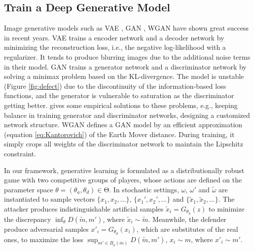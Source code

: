 \documentclass{article}
\begin{document}


\subsection{Train a Deep Generative Model}
Image generative models such as VAE \cite{DBLP:journals/corr/KingmaW13}, GAN \cite{NIPS2014_5423}, WGAN \cite{DBLP:journals/corr/ArjovskyCB17} have shown great success in recent years. VAE trains a encoder network and a decoder network by minimizing the reconstruction loss, i.e., the negative log-likelihood with a regularizer. It tends to produce blurring images due to the additional noise terms in their model. GAN trains a generator network and a discriminator network by solving a minimax problem based on the KL-divergence. The model is unstable (Figure \ref{fig:defect}) due to the discontinuity of the information-based loss functions, and the generator is vulnerable to saturation as the discriminator getting better. \cite{DBLP:journals/corr/ArjovskyB17, DBLP:conf/nips/SalimansGZCRCC16} gives some empirical solutions to these problems, e.g., keeping balance in training generator and discriminator networks, designing a customized network structure. WGAN \cite{DBLP:journals/corr/ArjovskyCB17} defines a GAN model by an efficient approximation (equation \ref{eq:Kantorovich}) of the Earth Mover distance. During training, it simply crops all weights of the discriminator network to maintain the Lipschitz constraint.

In our framework, generative learning is formulated as a distributionally robust game with two competitive groups of players, whose actions are defined on the parameter space $\theta = (\theta_a, \theta_d) \in \mathrm{\Theta}$. In stochastic settings, $\omega$, $\omega'$ and $\tilde{\omega}$ are instantiated to sample vectors $\{x_1, x_2, \ldots\}$, $\{x_1', x_2', \ldots\}$ and $\{\tilde{x}_1, \tilde{x}_2, \ldots\}$. The attacker produces indistinguishable artificial samples $\tilde{x}_i = G_{\theta_a}(z)$ to minimize the discrepancy $\inf_\theta D(\tilde{m},m')$, where $\tilde{x}_i \sim \tilde{m}$. Meanwhile, the defender produce adversarial samples $x'_i = G_{\theta_d}(x_i)$, which are substitutes of the real ones, to maximize the loss $\sup_{m' \in B_\rho(m)}D(\tilde{m},m')$, $x_i \sim m$, where $x'_i \sim m'$.
\end{document}
